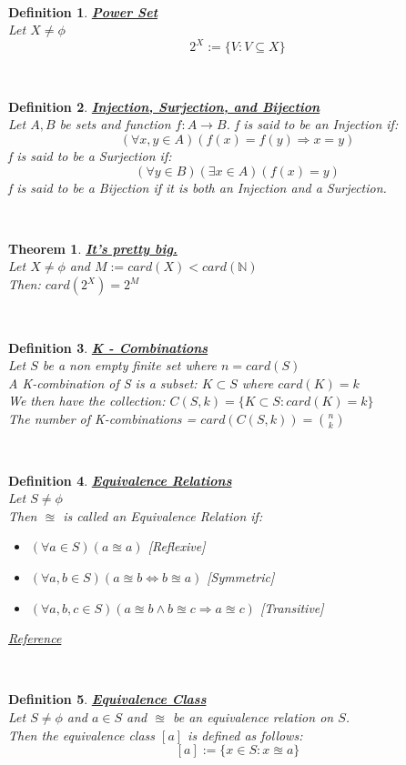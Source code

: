 \documentclass[12pt]{extarticle}
\theoremstyle{plain}
\newtheorem{thm}{Theorem}[section]
\theoremstyle{plain}
\theoremstyle{plain}
\theoremstyle{Definition}
\newtheorem{def.}{Definition}[section]
\theoremstyle{Definition}
\theoremstyle{plain}
\theoremstyle{plain}
\newcommand{\cut}[0]{\noindent\framebox[\linewidth]{\rule{\linewidth}{2pt}}\\}
\begin{document}
\cut
\begin{def.} \underline{\textbf{Power Set}} \\ 
	Let $X \not = \phi$ \\ 
	$$2^X := \{V : V \subseteq X\}$$
\end{def.}
\cut
\begin{def.} \underline{\textbf{Injection, Surjection, and Bijection}} \\
	Let $A,B$ be sets and  function $f : A \to B$.
	f is said to be an Injection if: \\ 
	$$(\forall x,y \in A)(f(x) = f(y) \Rightarrow x = y)$$
	f is said to be a Surjection if: \\ 
	$$(\forall y \in B)(\exists x \in A)(f(x) = y)$$
	f is said to be a Bijection if it is both an Injection and a Surjection.  
\end{def.}
\cut
\begin{thm} \underline{\textbf{It's pretty big.}} \\ 
	Let $X \not = \phi$ and $M := card(X) < card(\mathbb{N})$ \\
	Then: $card(2^X) = 2^M$ 
\end{thm}
\cut
\begin{def.} \underline{\textbf{K - Combinations}} \\
	Let $S$ be a non empty finite set where $n = card(S)$ \\ 
	A K-combination of S is a subset: $K \subset S$ where $card(K) = k$ \\ 
	We then have the collection: $C(S,k) = \{K \subset S : card(K) = k\}$ \\
	The number of K-combinations = $card(C(S,k)) = \binom{n}{k}$
\end{def.}
\cut
\begin{def.} \underline{\textbf{Equivalence Relations}} \\
	Let $S \not = \phi$ \\ 
	Then $\approxeq$ is called an Equivalence Relation if: 
	\begin{itemize}
		\item $(\forall a \in S)(a \approxeq a)$ \hfill [Reflexive]
		\item $(\forall a,b \in S)(a \approxeq b \Leftrightarrow b \approxeq a)$ \hfill [Symmetric]
		\item $(\forall a,b,c \in S)(a \approxeq b \wedge b \approxeq c \Rightarrow a \approxeq c)$ \hfill [Transitive] 
	\end{itemize}
\href{https://en.wikipedia.org/wiki/Equivalence_relation}{Reference}
\end{def.}
\cut
\begin{def.} \underline{\textbf{Equivalence Class}} \\
	Let $S \not = \phi$ and $a \in S$ and $\approxeq$ be an equivalence relation on $S$. \\
	Then the equivalence class $[a]$ is defined as follows: 
		$$[a] := \{x \in S : x \approxeq a\}$$
\end{def.}
\cut
\end{document}
